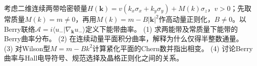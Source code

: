 考虑二维连续两带哈密顿量\(H(\boldsymbol k)=v(k_x\sigma_x+k_y\sigma_y)+M(k)\sigma_z\)，\(v>0\)；先取常质量\(M(k)=m\ne0\)，再用\(M(k)=m-B|\boldsymbol k|^2\)作高动量正则化，\(B\ne0\)。以Berry联络\(\mathcal A=i\langle u_-|\nabla_{\boldsymbol k}u_-\rangle\)定义下能带曲率。
(1) 求两能带及常质量下能带的Berry曲率分布。
(2) 在连续动量平面积分曲率，解释为什么仅得半整数通量。
(3) 对Wilson型\(M=m-Bk^2\)计算紧化平面的Chern数并指出相变。
(4) 讨论Berry曲率与Hall电导符号、规范选择及晶格正则化之间的关系。
